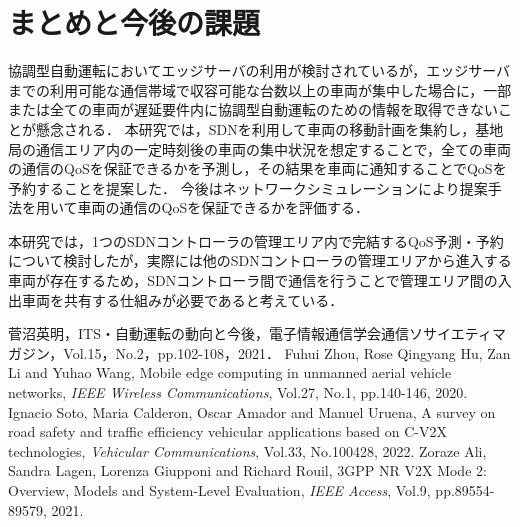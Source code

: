 \documentclass[a4paper,10pt,twocolumn,uplatex]{jsarticle}
\begin{document}
\section{まとめと今後の課題}
協調型自動運転においてエッジサーバの利用が検討されているが，エッジサーバまでの利用可能な通信帯域で収容可能な台数以上の車両が集中した場合に，一部または全ての車両が遅延要件内に協調型自動運転のための情報を取得できないことが懸念される．
本研究では，SDNを利用して車両の移動計画を集約し，基地局の通信エリア内の一定時刻後の車両の集中状況を想定することで，全ての車両の通信のQoSを保証できるかを予測し，その結果を車両に通知することでQoSを予約することを提案した．
今後はネットワークシミュレーションにより提案手法を用いて車両の通信のQoSを保証できるかを評価する．\par
本研究では，1つのSDNコントローラの管理エリア内で完結するQoS予測・予約について検討したが，実際には他のSDNコントローラの管理エリアから進入する車両が存在するため，SDNコントローラ間で通信を行うことで管理エリア間の入出車両を共有する仕組みが必要であると考えている．

\footnotesize{
  \begin{thebibliography}{99}
     菅沼英明，ITS・自動運転の動向と今後，電子情報通信学会通信ソサイエティマガジン，Vol.15，No.2，pp.102-108，2021．
     Fuhui Zhou, Rose Qingyang Hu, Zan Li and Yuhao Wang, Mobile edge computing in unmanned aerial vehicle networks, \textit{IEEE Wireless Communications}, Vol.27, No.1, pp.140-146, 2020.
     Ignacio Soto, Maria Calderon, Oscar Amador and Manuel Uruena, A survey on road safety and traffic efficiency vehicular applications based on C-V2X technologies, \textit{Vehicular Communications}, Vol.33, No.100428, 2022.
     Zoraze Ali, Sandra Lagen, Lorenza Giupponi and Richard Rouil, 3GPP NR V2X Mode 2: Overview, Models and System-Level Evaluation, \textit{IEEE Access},
    Vol.9, pp.89554-89579, 2021.
  \end{thebibliography}
}

% 
% 

\end{document}
